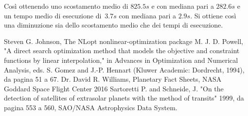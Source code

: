 \documentclass[a4paper,12pt]{report}
\begin{document}
Così ottenendo uno scostamento medio di $825.5s$ e con mediana pari a $282.6s$ e un tempo medio di esecuzione di~$3.7s$ con mediana pari a $2.9s$.
Si ottiene così una diminuzione sia dello scostamento medio che dei tempi di esecuzione.



%
%
\begin{thebibliography}{00}
Steven G. Johnson, The NLopt nonlinear-optimization package
%
M. J. D. Powell, "A direct search optimization method that models the objective and constraint functions by linear interpolation," in Advances in Optimization and Numerical Analysis, eds. S. Gomez and J.-P. Hennart (Kluwer Academic: Dordrecht, 1994), da pagina 51 a 67.
%
Dr. David R. Williams, Planetary Fact Sheets, NASA Goddard Space Flight Center 2016
%
Sartoretti P. and Schneide, J. "On the detection of satellites of extrasolar planets with the method of transits" 1999, da pagina 553 a 560, SAO/NASA Astrophysics Data System.

\end{thebibliography}

%
\end{document}
